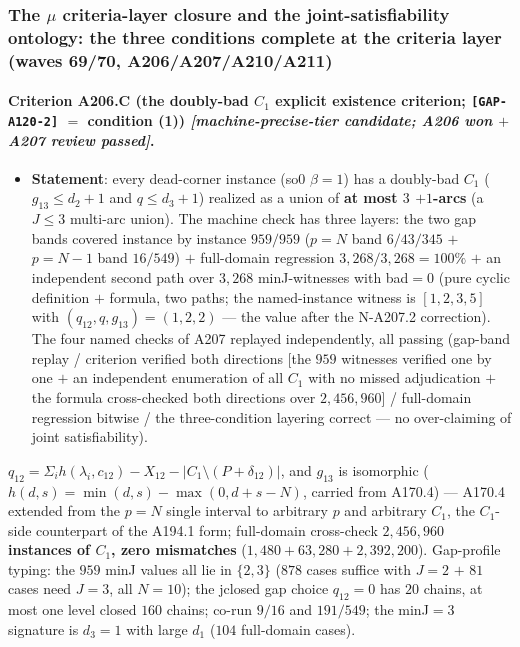 \subsubsection{The $\mu$ criteria-layer closure and the
joint-satisfiability ontology: the three conditions complete at the criteria
layer (waves 69/70, A206/A207/A210/A211)}\label{subsec:add-mu}

\paragraph{Criterion A206.C (the doubly-bad $C_1$ explicit existence
criterion; \texttt{[GAP-A120-2]} $=$ condition (1))
\emph{[machine-precise-tier candidate; A206 won $+$ A207 review passed]}.}
\begin{itemize}
\item \textbf{Statement}: every dead-corner instance (so0 $\beta=1$) has a
doubly-bad $C_1$ ($g_{13}\le d_2+1$ and $q\le d_3+1$) realized as a union of
\textbf{at most $3$ $+1$-arcs} (a $J\le3$ multi-arc union). The machine
check has three layers: the two gap bands covered instance by instance
\textbf{$959/959$} ($p=N$ band $6/43/345$ $+$ $p=N-1$ band $16/549$) $+$
full-domain regression \textbf{$3{,}268/3{,}268=100\%$} $+$ an independent
second path over $3{,}268$ minJ-witnesses with bad$=0$ (pure cyclic
definition $+$ formula, two paths; the named-instance witness is
\textbf{$[1,2,3,5]$} with $(q_{12},q,g_{13})=(1,2,2)$ --- the value after
the N-A207.2 correction). The four named checks of A207 replayed
independently, all passing (gap-band replay / criterion verified both
directions [the $959$ witnesses verified one by one $+$ an independent
enumeration of all $C_1$ with no missed adjudication $+$ the formula
cross-checked both directions over $2{,}456{,}960$] / full-domain
regression bitwise / the three-condition layering correct --- no
over-claiming of joint satisfiability).
\end{itemize}

\begin{proposition}\label{prop:a2061}
$q_{12}=\Sigma_i h(\lambda_i,c_{12})-X_{12}-\lvert C_1\setminus
(P+\delta_{12})\rvert$, and $g_{13}$ is isomorphic
($h(d,s)=\min(d,s)-\max(0,d+s-N)$, carried from A170.4) --- A170.4 extended
from the $p=N$ single interval to arbitrary $p$ and arbitrary $C_1$, the
$C_1$-side counterpart of the A194.1 form; full-domain cross-check
\textbf{$2{,}456{,}960$ instances of $C_1$, zero mismatches}
($1{,}480+63{,}280+2{,}392{,}200$). Gap-profile typing: the $959$ minJ
values all lie in $\{2,3\}$ ($878$ cases suffice with $J=2$ $+$ $81$ cases
need $J=3$, all $N=10$); the jclosed gap choice $q_{12}=0$ has $20$
chains, at most one level closed $160$ chains; co-run $9/16$ and
$191/549$; the minJ$=3$ signature is $d_3=1$ with large $d_1$ ($104$
full-domain cases).
\end{proposition}


